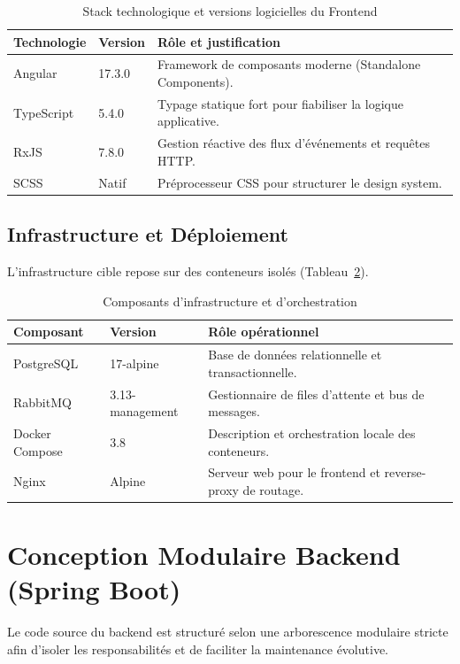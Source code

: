 \begin{table}[H]
    \centering
    \caption{Stack technologique et versions logicielles du Frontend}
    \label{tab:stack_frontend}
    \begin{tabular}{lll}
        \toprule
        \textbf{Technologie} & \textbf{Version} & \textbf{Rôle et justification} \\
        \midrule
        Angular & 17.3.0 & Framework de composants moderne (Standalone Components). \\
        TypeScript & 5.4.0 & Typage statique fort pour fiabiliser la logique applicative. \\
        RxJS & 7.8.0 & Gestion réactive des flux d'événements et requêtes HTTP. \\
        SCSS & Natif & Préprocesseur CSS pour structurer le design system. \\
        \bottomrule
    \end{tabular}
\end{table}

\subsection{Infrastructure et Déploiement}
L'infrastructure cible repose sur des conteneurs isolés (Tableau~\ref{tab:stack_infra}).

\begin{table}[H]
    \centering
    \caption{Composants d'infrastructure et d'orchestration}
    \label{tab:stack_infra}
    \begin{tabular}{lll}
        \toprule
        \textbf{Composant} & \textbf{Version} & \textbf{Rôle opérationnel} \\
        \midrule
        PostgreSQL & 17-alpine & Base de données relationnelle et transactionnelle. \\
        RabbitMQ & 3.13-management & Gestionnaire de files d'attente et bus de messages. \\
        Docker Compose & 3.8 & Description et orchestration locale des conteneurs. \\
        Nginx & Alpine & Serveur web pour le frontend et reverse-proxy de routage. \\
        \bottomrule
    \end{tabular}
\end{table}

\section{Conception Modulaire Backend (Spring Boot)}
Le code source du backend est structuré selon une arborescence modulaire stricte afin d'isoler les responsabilités et de faciliter la maintenance évolutive.

